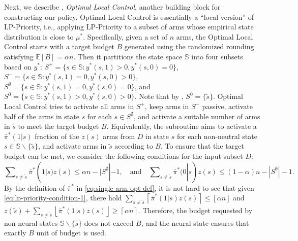 \documentclass[11pt,letterpaper]{article}
\theoremstyle{plain}
\theoremstyle{definition}
\theoremstyle{remark}
\newcommand{\E}[1]{\mathbb{E}\left[#1\right]}
\newcommand{\ceil}[1]{\left\lceil#1\right\rceil}
\newcommand{\floor}[1]{\left\lfloor#1\right\rfloor}
\newcommand{\sspa}{\mathbb{S}}
\newcommand{\bsub}{B}
\newcommand{\pibar}{{\sysbar{\pi}}}
\newcommand{\pibs}{{\pibar^*}}
\newcommand{\sysbar}[1]{\bar{#1}}
\newcommand{\sempty}{S^{\emptyset}}
\newcommand{\statdist}{\mu^*}
\newcommand{\sneu}{\tilde{s}}
\begin{document}
Next, we describe , \emph{Optimal Local Control}, another building block for constructing our policy. Optimal Local Control is essentially a ``local version'' of LP-Priority, i.e., applying LP-Priority to a subset of arms whose empirical state distribution is close to $\statdist$. Specifically, given a set of $n$ arms, the Optimal Local Control starts with a target budget $B$ generated using the randomized rounding satisfying $\E{B} = \alpha n$. Then it partitions the state space $\sspa$ into four subsets based on $y^*$: $S^+ = \{s\in \sspa \colon y^*(s,1) > 0, y^*(s,0) = 0\}$,  $S^- = \{s\in \sspa \colon y^*(s,1) = 0, y^*(s,0) > 0 \}$,  $S^{\emptyset} = \{s\in \sspa \colon y^*(s,1) = 0, y^*(s,0) = 0\}$,  and $S^0 = \{s\in \sspa \colon y^*(s,1) > 0, y^*(s,0) > 0\}$. 
Note that by , $S^0 = \{\sneu\}$. Optimal Local Control tries to activate all arms in $S^+$, keep arms in $S^-$ passive, activate half of the arms in state $s$ for each $s\in S^{\emptyset}$, and activate a suitable number of arms in $\sneu$ to meet the target budget $\bsub$.
Equivalently, the subroutine aims to activate a $\pibs(1|s)$ fraction of the $z(s)$ arms from $D$ in state $s$ for each non-neutral state $s\in \sspa \backslash \{\sneu\}$, and activate arms in $\sneu$ according to $B$. 
To ensure that the target budget can be met, we consider the following conditions for the input subset $D$:
\begin{equation}
        \label{eq:lp-priority-condition-1}
        \sum\nolimits_{s\neq \sneu} \pibs(1|s) z(s) \leq  \alpha n - |\sempty|-1, \quad \mbox{and} \quad
         \sum\nolimits_{s\neq \sneu} \pibs(0|s) z(s) \leq (1-\alpha)n - |\sempty|-1.
\end{equation}
By the definition of $\pibs$ in \eqref{eq:single-arm-opt-def}, it is not hard to see that given \eqref{eq:lp-priority-condition-1}, there hold $\sum_{s\neq \sneu} \ceil{\pibs(1|s) z(s)} \leq \floor{\alpha n}$ and $z(\sneu) + \sum_{s\neq \sneu} \floor{\pibs(1|s) z(s)} \geq  \ceil{\alpha n}$. Therefore, the budget requested by non-neural states $\sspa \backslash \{\sneu\}$ does not exceed $B$, 
and the neural state ensures that exactly $\bsub$ unit of budget is used. 
\end{document}
